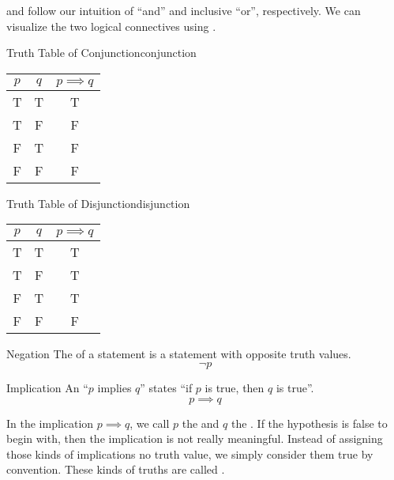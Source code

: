 \documentclass[12pt]{report}
\begin{document}
 and  follow our intuition of ``and'' and inclusive ``or'', respectively. We can visualize the two logical connectives using .

\begin{exbox}{Truth Table of Conjunction}{conjunction}
    \begin{center}\begin{tabular}{c | c || c}
        $p$ & $q$ & $p \implies q$ \\ \hline
        T & T & T \\
        T & F & F \\
        F & T & F \\
        F & F & F
    \end{tabular}\end{center}
\end{exbox}

\begin{exbox}{Truth Table of Disjunction}{disjunction}
    \begin{center}\begin{tabular}{c | c || c}
        $p$ & $q$ & $p \implies q$ \\ \hline
        T & T & T \\
        T & F & T \\
        F & T & T \\
        F & F & F
    \end{tabular}\end{center}
\end{exbox}



\begin{dfnbox}{Negation}{}
    The  of a statement is a statement with opposite truth values.
    \tcblower
    \[ \neg p \]
\end{dfnbox}

\begin{dfnbox}{Implication}{}
    An  ``$p$ implies $q$'' states ``if $p$ is true, then $q$ is true''.
    \tcblower
    \[ p \implies q \]
\end{dfnbox}

In the implication $p \implies q$, we call $p$ the  and $q$ the . If the hypothesis is false to begin with, then the implication is not really meaningful. Instead of assigning those kinds of implications no truth value, we simply consider them true by convention. These kinds of truths are called .
\end{document}
